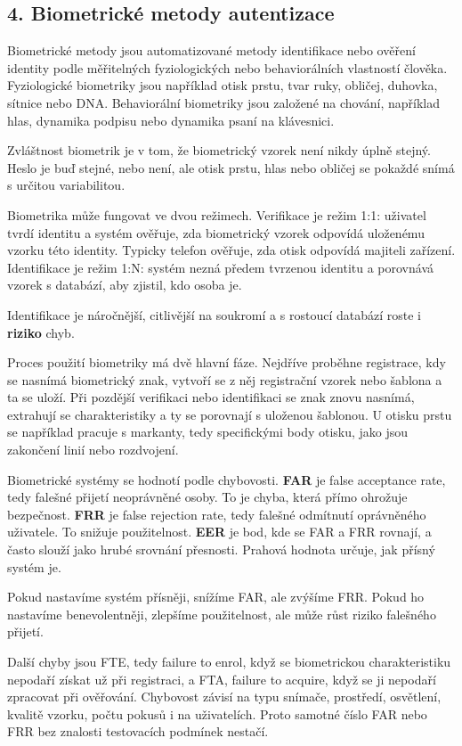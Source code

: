 \documentclass[11pt,a4paper]{article}
\begin{document}
\subsection*{4. Biometrické metody autentizace}

Biometrické metody jsou automatizované metody identifikace nebo ověření identity podle měřitelných fyziologických nebo behaviorálních vlastností člověka. Fyziologické biometriky jsou například otisk prstu, tvar ruky, obličej, duhovka, sítnice nebo DNA. Behaviorální biometriky jsou založené na chování, například hlas, dynamika podpisu nebo dynamika psaní na klávesnici.

Zvláštnost biometrik je v tom, že biometrický vzorek není nikdy úplně stejný. Heslo je buď stejné, nebo není, ale otisk prstu, hlas nebo obličej se pokaždé snímá s určitou variabilitou.

Biometrika může fungovat ve dvou režimech. Verifikace je režim 1:1: uživatel tvrdí identitu a systém ověřuje, zda biometrický vzorek odpovídá uloženému vzorku této identity. Typicky telefon ověřuje, zda otisk odpovídá majiteli zařízení. Identifikace je režim 1:N: systém nezná předem tvrzenou identitu a porovnává vzorek s databází, aby zjistil, kdo osoba je.

Identifikace je náročnější, citlivější na soukromí a s rostoucí databází roste i \textbf{riziko} chyb.

Proces použití biometriky má dvě hlavní fáze. Nejdříve proběhne registrace, kdy se nasnímá biometrický znak, vytvoří se z něj registrační vzorek nebo šablona a ta se uloží. Při pozdější verifikaci nebo identifikaci se znak znovu nasnímá, extrahují se charakteristiky a ty se porovnají s uloženou šablonou. U otisku prstu se například pracuje s markanty, tedy specifickými body otisku, jako jsou zakončení linií nebo rozdvojení.

Biometrické systémy se hodnotí podle chybovosti. \textbf{FAR} je false acceptance rate, tedy falešné přijetí neoprávněné osoby. To je chyba, která přímo ohrožuje bezpečnost. \textbf{FRR} je false rejection rate, tedy falešné odmítnutí oprávněného uživatele. To snižuje použitelnost. \textbf{EER} je bod, kde se FAR a FRR rovnají, a často slouží jako hrubé srovnání přesnosti. Prahová hodnota určuje, jak přísný systém je.

Pokud nastavíme systém přísněji, snížíme FAR, ale zvýšíme FRR. Pokud ho nastavíme benevolentněji, zlepšíme použitelnost, ale může růst riziko falešného přijetí.

Další chyby jsou FTE, tedy failure to enrol, když se biometrickou charakteristiku nepodaří získat už při registraci, a FTA, failure to acquire, když se ji nepodaří zpracovat při ověřování. Chybovost závisí na typu snímače, prostředí, osvětlení, kvalitě vzorku, počtu pokusů i na uživatelích. Proto samotné číslo FAR nebo FRR bez znalosti testovacích podmínek nestačí.
\end{document}
